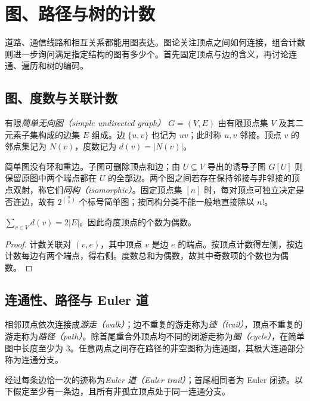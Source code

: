 \setcounter{chapter}{9} %
\chapter{图、路径与树的计数}
\label{ch:graphs-trees}

道路、通信线路和相互关系都能用图表达。图论关注顶点之间如何连接，组合计数则进一步询问满足指定结构的图有多少个。首先固定顶点与边的含义，再讨论连通、遍历和树的编码。

\section{图、度数与关联计数}

\begin{definition}
有限\emph{简单无向图（simple undirected graph）} $G=(V,E)$ 由有限顶点集 $V$ 及其二元素子集构成的边集 $E$ 组成。边 $\{u,v\}$ 也记为 $uv$；此时称 $u,v$ 邻接。顶点 $v$ 的邻点集记为 $N(v)$，度数记为 $d(v)=|N(v)|$。
\end{definition}

简单图没有环和重边。子图可删除顶点和边；由 $U\subseteq V$ 导出的诱导子图 $G[U]$ 则保留原图中两个端点都在 $U$ 的全部边。两个图之间若存在保持邻接与非邻接的顶点双射，称它们\emph{同构（isomorphic）}。固定顶点集 $[n]$ 时，每对顶点可独立决定是否连边，故有 $2^{\binom n2}$ 个标号简单图；按同构分类不能一般地直接除以 $n!$。

\begin{theorem}[握手定理]
$\sum_{v\in V}d(v)=2|E|$。因此奇度顶点的个数为偶数。
\end{theorem}
\begin{proof}
计数关联对 $(v,e)$，其中顶点 $v$ 是边 $e$ 的端点。按顶点计数得左侧，按边计数每边有两个端点，得右侧。度数总和为偶数，故其中奇数项的个数也为偶数。
\end{proof}

\section{连通性、路径与 Euler 道}

相邻顶点依次连接成\emph{游走（walk）}；边不重复的游走称为\emph{迹（trail）}，顶点不重复的游走称为\emph{路径（path）}。除首尾重合外顶点均不同的闭游走称为\emph{圈（cycle）}，在简单图中长度至少为 $3$。任意两点之间存在路径的非空图称为连通图，其极大连通部分称为连通分支。

经过每条边恰一次的迹称为\emph{Euler 道（Euler trail）}；首尾相同者为 Euler 闭迹。以下假定至少有一条边，且所有非孤立顶点处于同一连通分支。

